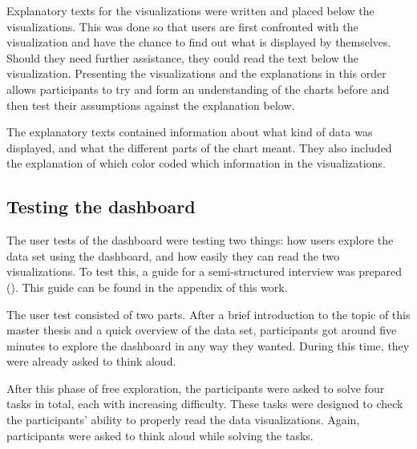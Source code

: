 Explanatory texts for the visualizations were written and placed below the visualizations. This was done so that users are first confronted with the visualization and have the chance to find out what is displayed by themselves. Should they need further assistance, they could read the text below the visualization. Presenting the visualizations and the explanations in this order allows participants to try and form an understanding of the charts before and then test their assumptions against the explanation below.

The explanatory texts contained information about what kind of data was displayed, and what the different parts of the chart meant. They also included the explanation of which color coded which information in the visualizations.

\subsection{Testing the dashboard}
The user tests of the dashboard were testing two things: how users explore the data set using the dashboard, and how easily they can read the two visualizations. To test this, a guide for a semi-structured interview was prepared (\cite[315ff.]{schnell1999methoden}). This guide can be found in the appendix of this work.

The user test consisted of two parts. After a brief introduction to the topic of this master thesis and a quick overview of the data set, participants got around five minutes to explore the dashboard in any way they wanted. During this time, they were already asked to think aloud.

After this phase of free exploration, the participants were asked to solve four tasks in total, each with increasing difficulty. These tasks were designed to check the participants' ability to properly read the data visualizations. Again, participants were asked to think aloud while solving the tasks.

